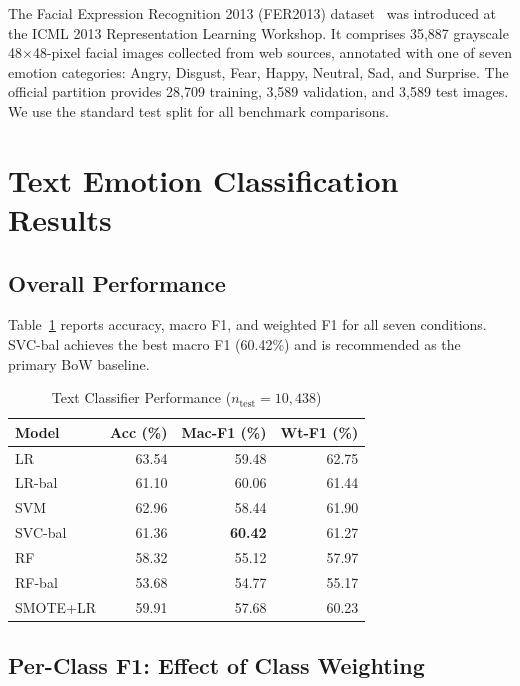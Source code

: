 \documentclass[conference]{IEEEtran}
\begin{document}
The Facial Expression Recognition 2013 (FER2013)
dataset~\cite{goodfellow2013fer} was introduced at the ICML 2013
Representation Learning Workshop.
It comprises 35,887 grayscale 48$\times$48-pixel facial images
collected from web sources, annotated with one of seven emotion
categories: Angry, Disgust, Fear, Happy, Neutral, Sad, and
Surprise.
The official partition provides 28,709 training, 3,589
validation, and 3,589 test images.
We use the standard test split for all benchmark comparisons.

\section{Text Emotion Classification Results}
\label{sec:results}

\subsection{Overall Performance}

Table~\ref{tab:summary} reports accuracy, macro F1, and
weighted F1 for all seven conditions.
SVC-bal achieves the best macro F1 (60.42\%) and is
recommended as the primary BoW baseline.

\begin{table}[htbp]
\centering
\caption{Text Classifier Performance ($n_{\text{test}}{=}10{,}438$)}
\label{tab:summary}
\begin{tabular}{lrrr}
\toprule
\textbf{Model} & \textbf{Acc (\%)} & \textbf{Mac-F1 (\%)} &
\textbf{Wt-F1 (\%)} \\
\midrule
LR          & 63.54 & 59.48 & 62.75 \\
LR-bal      & 61.10 & 60.06 & 61.44 \\
SVM         & 62.96 & 58.44 & 61.90 \\
SVC-bal     & 61.36 & \textbf{60.42} & 61.27 \\
RF          & 58.32 & 55.12 & 57.97 \\
RF-bal      & 53.68 & 54.77 & 55.17 \\
SMOTE+LR    & 59.91 & 57.68 & 60.23 \\
\bottomrule
\end{tabular}
\end{table}

\subsection{Per-Class F1: Effect of Class Weighting}
\end{document}
